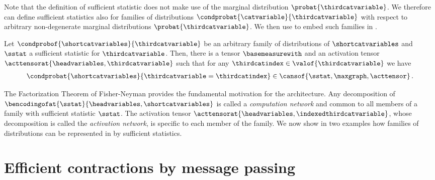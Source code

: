 Note that the definition of sufficient statistic does not make use of the marginal distribution $\probat{\thirdcatvariable}$.
We therefore can define sufficient statistics also for families of distributions $\condprobat{\catvariable}{\thirdcatvariable}$ with respect to arbitrary non-degenerate marginal distributions $\probat{\thirdcatvariable}$.
We then use  to embed such families in \CompActNets{}.

\begin{corollary}
    Let $\condprobof{\shortcatvariables}{\thirdcatvariable}$ be an arbitrary family of distributions of $\shortcatvariables$ and $\sstat$ a sufficient statistic for $\thirdcatvariable$.
    Then, there is a tensor $\basemeasurewith$ and an activation tensor $\acttensorat{\headvariables,\thirdcatvariable}$ such that for any $\thirdcatindex\in\valof{\thirdcatvariable}$ we have
    \begin{align*}
        \condprobat{\shortcatvariables}{\thirdcatvariable=\thirdcatindex} \in\cansof{\sstat,\maxgraph, \acttensor} \, . %
    \end{align*}
\end{corollary}

The Factorization Theorem of Fisher-Neyman provides the fundamental motivation for the \CompActNets{} architecture.
Any decomposition of $\bencodingofat{\sstat}{\headvariables,\shortcatvariables}$ is called a \emph{computation network} and common to all members of a family with sufficient statistic $\sstat$.
The activation tensor $\acttensorat{\headvariables,\indexedthirdcatvariable}$, whose decomposition is called the \emph{activation network}, is specific to each member of the family.
We now show in two examples how families of distributions can be represented in \CompActNets{} by sufficient statistics.





\section{Efficient contractions by message passing}

